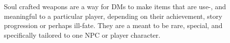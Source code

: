 \begin{note}
  Soul crafted weapons are a way for DMs to make items that are use-, and
  meaningful to a particular player, depending on their achievement, story
  progression or perhaps ill-fate. They are a meant to be rare, special, and
  specifically tailored to one NPC or player character.
\end{note}
